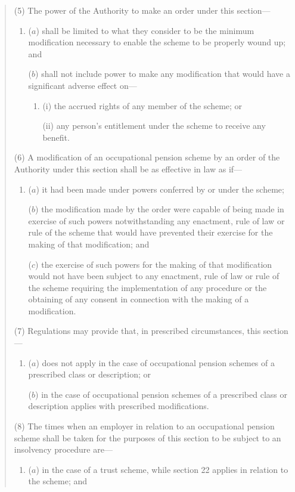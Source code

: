 \documentclass[12pt,a4paper]{article}
\begin{document}
\begin{quotation}
(5) The power of the Authority to make an order under this section—
\begin{enumerate}\item[]
($a$) shall be limited to what they consider to be the minimum modification necessary to enable the scheme to be properly wound up; and

($b$) shall not include power to make any modification that would have a significant adverse effect on—
\begin{enumerate}\item[]
(i) the accrued rights of any member of the scheme; or

(ii) any person’s entitlement under the scheme to receive any benefit.
\end{enumerate}
\end{enumerate}

(6) A modification of an occupational pension scheme by an order of the Authority under this section shall be as effective in law as if—
\begin{enumerate}\item[]
($a$) it had been made under powers conferred by or under the scheme;

($b$) the modification made by the order were capable of being made in exercise of such powers notwithstanding any enactment, rule of law or rule of the scheme that would have prevented their exercise for the making of that modification; and

($c$) the exercise of such powers for the making of that modification would not have been subject to any enactment, rule of law or rule of the scheme requiring the implementation of any procedure or the obtaining of any consent in connection with the making of a modification.
\end{enumerate}

(7) Regulations may provide that, in prescribed circumstances, this section—
\begin{enumerate}\item[]
($a$) does not apply in the case of occupational pension schemes of a prescribed class or description; or

($b$) in the case of occupational pension schemes of a prescribed class or description applies with prescribed modifications.
\end{enumerate}

(8) The times when an employer in relation to an occupational pension scheme shall be taken for the purposes of this section to be subject to an insolvency procedure are—
\begin{enumerate}\item[]
($a$) in the case of a trust scheme, while section 22 applies in relation to the scheme; and


\end{enumerate}
\end{quotation}
\end{document}
